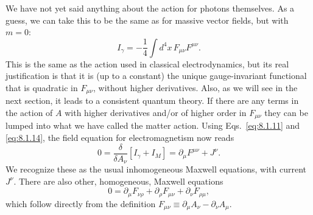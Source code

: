 We have not yet said anything about the action for photons themselves.
As a guess, we can take this to be the same as for massive vector fields,
but with $m=0$:
\begin{equation}
  I_\gamma=-\frac14\int d^4x\,F_{\mu\nu}F^{\mu\nu}.
  \tag{8.1.14}\label{eq:8.1.14}
\end{equation}
This is the same as the action used in classical electrodynamics, but its
real justification is that it is (up to a constant) the unique gauge-invariant
functional that is quadratic in $F_{\mu\nu}$, without higher derivatives. Also,
as we will see in the next section, it leads to a consistent quantum theory.
If there are any terms in the action of $A$ with higher derivatives and/or
of higher order in $F_{\mu\nu}$ they can be lumped into what we have called
the matter action. Using Eqs.~\eqref{eq:8.1.11} and \eqref{eq:8.1.14}, the field equation for
electromagnetism now reads
\begin{equation}
  0=\frac{\delta}{\delta A_\nu}[I_\gamma+I_M]
  =\partial_\mu F^{\mu\nu}+J^\nu.
  \tag{8.1.15}\label{eq:8.1.15}
\end{equation}
We recognize these as the usual inhomogeneous Maxwell equations, with
current $J^\nu$. There are also other, homogeneous, Maxwell equations
\begin{equation}
  0=\partial_\mu F_{\nu\rho}+\partial_\rho F_{\mu\nu}
  +\partial_\nu F_{\rho\mu},
  \tag{8.1.16}\label{eq:8.1.16}
\end{equation}
which follow directly from the definition
$F_{\mu\nu}\equiv\partial_\mu A_\nu-\partial_\nu A_\mu$.

